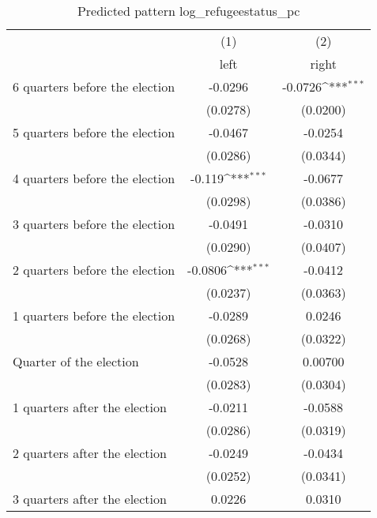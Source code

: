\begin{table}[htbp]\centering
\def\sym#1{\ifmmode^{#1}\else\(^{#1}\)\fi}
\caption{Predicted pattern log\_refugeestatus\_pc}
\begin{tabular}{l*{2}{c}}
\hline\hline
                    &\multicolumn{1}{c}{(1)}&\multicolumn{1}{c}{(2)}\\
                    &\multicolumn{1}{c}{left}&\multicolumn{1}{c}{right}\\
\hline
 6 quarters before the election&     -0.0296         &     -0.0726\sym{***}\\
                    &    (0.0278)         &    (0.0200)         \\
[1em]
 5 quarters before the election&     -0.0467         &     -0.0254         \\
                    &    (0.0286)         &    (0.0344)         \\
[1em]
 4 quarters before the election&      -0.119\sym{***}&     -0.0677         \\
                    &    (0.0298)         &    (0.0386)         \\
[1em]
 3 quarters before the election&     -0.0491         &     -0.0310         \\
                    &    (0.0290)         &    (0.0407)         \\
[1em]
 2 quarters before the election&     -0.0806\sym{***}&     -0.0412         \\
                    &    (0.0237)         &    (0.0363)         \\
[1em]
 1 quarters before the election&     -0.0289         &      0.0246         \\
                    &    (0.0268)         &    (0.0322)         \\
[1em]
Quarter of the election&     -0.0528         &     0.00700         \\
                    &    (0.0283)         &    (0.0304)         \\
[1em]
 1 quarters after the election&     -0.0211         &     -0.0588         \\
                    &    (0.0286)         &    (0.0319)         \\
[1em]
 2 quarters after the election&     -0.0249         &     -0.0434         \\
                    &    (0.0252)         &    (0.0341)         \\
[1em]
 3 quarters after the election&      0.0226         &      0.0310         \\

\end{tabular}
\end{table}
